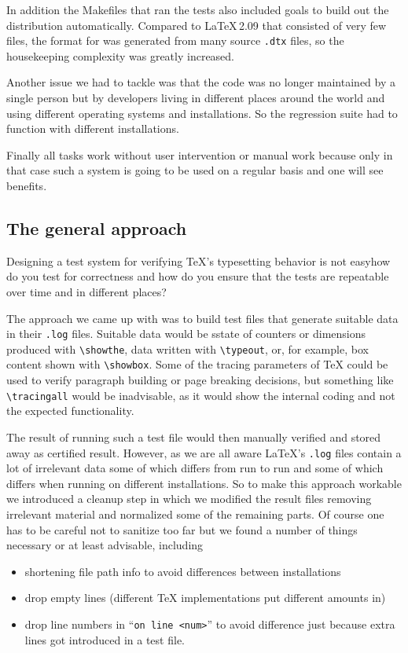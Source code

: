 \documentclass[a4paper]{ltugboat}
\begin{document}
In addition the Makefiles that ran the tests also included goals to
build out the distribution automatically.  Compared to \LaTeX\,2.09
that consisted of very few files, the format for \LaTeXe{} was
generated from many source \texttt{.dtx} files, so the housekeeping
complexity was greatly increased.

Another issue we had to tackle was that the code was no longer
maintained by a single person but by developers living in different
places around the world and using different operating systems and
installations. So the regression suite had to function with different
installations.

Finally all tasks work without user intervention or manual work because
only in that case such a system is going to be used on a regular basis
and one will see benefits.

\subsection{The general approach}

Designing a test system for verifying \TeX's typesetting behavior is
not easy\Dash how do you test for correctness and how do you ensure
that the tests are repeatable over time and in different places?

The approach we came up with was to build test files that generate
suitable data in their \texttt{.log} files. Suitable data would be
sstate of counters or dimensions produced with \verb|\showthe|, data
written with \verb|\typeout|, or, for example, box content shown with
\verb|\showbox|. Some of the tracing parameters of \TeX{} could be used to
verify paragraph building or page breaking decisions, but something
like \verb|\tracingall| would be inadvisable, as it would show the
internal coding and not the expected functionality.

The result of running such a test file would then manually verified
and stored away as certified result. However, as we are all aware
\LaTeX's \texttt{.log} files contain a lot of irrelevant data some of
which differs from run to run and some of which differs when running
on different installations. So to make this approach workable we
introduced a cleanup step in which we modified the result files
removing irrelevant material and normalized some of the remaining
parts. Of course one has to be careful not to sanitize too far but we
found a number of things necessary or at least advisable, including
\begin{itemize}
\item  shortening file path info to avoid differences between
installations
\item drop empty lines (different \TeX{} implementations put
different amounts in)
\item drop line numbers in ``\texttt{on line <num>}'' to avoid difference
 just because extra lines got introduced in a test file.
\end{itemize}
\end{document}
